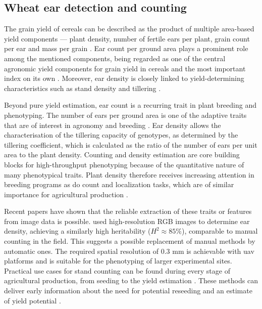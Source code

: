 \documentclass[12pt,parskip = half, DIV=classic,listof=totoc]{scrartcl}
\begin{document}
		\subsection{Wheat ear detection and counting}
			The grain yield of cereals can be described as the product of multiple area-based yield components --- 
			plant density, number of fertile ears per plant, grain count per ear and mass per grain \cite{guoAerialImageryAnalysis2018}.
			Ear count per ground area plays a prominent role among the mentioned components, being regarded as one of the 
			central agronomic yield components for grain yield in cereals \cite{fernandezWheatEarCounting2018} and 
			the most important index on its own \cite{xiongTasselNetv2InfieldCounting2019}.
			Moreover, ear density is closely linked to yield-determining characteristics such as stand density 
			and tillering \cite{madecEarDensityEstimation2019}.

			Beyond pure yield estimation, ear count is a recurring trait in plant breeding and phenotyping. 
			The number of ears per ground area is one of the adaptive traits that are of interest in agronomy 
			and breeding \cite{guoAerialImageryAnalysis2018, madecEarDensityEstimation2019}.
			Ear density allows the characterisation of the tillering capacity of genotypes, as determined by the tillering coefficient, 
			which is calculated as the ratio of the number of ears per unit area to the plant density.
			Counting and density estimation are core building blocks for high-throughput phenotyping because of the quantitative nature of many phenotypical traits.
			Plant density therefore receives increasing attention in breeding programs\cite{jinEstimatesPlantDensity2017a, luCaoTasselNetV2F2020} 
			as do count and localization tasks, which are of similar importance for agricultural production \cite{karamiAutomaticPlantCounting2020}.

			Recent papers have shown that the reliable extraction of these traits or features from image data is possible. \textcite{madecEarDensityEstimation2019}
			used high-resolution RGB images to determine ear density, achieving a similarly high heritability ($H^2\approx 85\%$), comparable to manual counting in the field. 
			This suggests a possible replacement of manual methods by automatic ones. The required spatial resolution of 0.3 mm is achievable with \ac{uav} platforms and 
			is suitable for the phenotyping of larger experimental sites. Practical use cases for stand counting can be found during every stage of agricultural production, 
			from seeding to the yield estimation \cite{luCaoTasselNetV2F2020}. These methods can deliver early information about the need for potential reseeding 
			and an estimate of yield potential \cite{khakiHighthroughputImagebasedPlant2022}.
\end{document}
